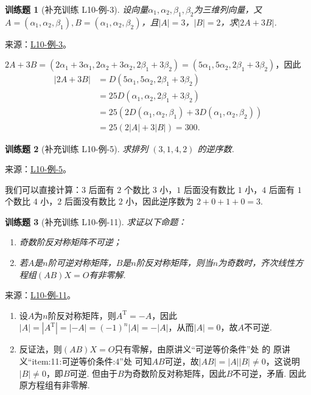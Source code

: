 \documentclass[12pt,fontset=fandol]{ctexart}
\newtheorem{exercise}{训练题}[section]
\begin{document}
\begin{exercise}[补充训练 L10-例-3]\label{prob:L10-例-3}
设向量$\alpha_1,\alpha_2,\beta_1,\beta_2$为三维列向量，又$A=(\alpha_1,\alpha_2,\beta_1),B=(\alpha_1,\alpha_2,\beta_2)$，且$|A|=3$，$|B|=2$，求$|2A+3B|$.
\end{exercise}
\noindent 来源：\href{https://github.com/yhwu-is/Linear-Algebra-Left-Undone/blob/new/%E8%AE%B2%E4%B9%89/%E4%B8%93%E9%A2%98/10%20%E8%A1%8C%E5%88%97%E5%BC%8F.tex}{L10-例-3}。
\begin{solve}
$2A+3B=(2\alpha_1+3\alpha_1,2\alpha_2+3\alpha_2,2\beta_1+3\beta_2)=(5\alpha_1,5\alpha_2,2\beta_1+3\beta_2)$，因此
    \begin{align*}
        |2A+3B| & =D(5\alpha_1,5\alpha_2,2\beta_1+3\beta_2)                        \\
                & =25D(\alpha_1,\alpha_2,2\beta_1+3\beta_2)                        \\
                & =25(2D(\alpha_1,\alpha_2,\beta_1)+3D(\alpha_1,\alpha_2,\beta_2)) \\
                & =25(2|A|+3|B|)=300.
    \end{align*}
\end{solve}

\begin{exercise}[补充训练 L10-例-5]\label{prob:L10-例-5}
求排列 $(3,1,4,2)$ 的逆序数.
\end{exercise}
\noindent 来源：\href{https://github.com/yhwu-is/Linear-Algebra-Left-Undone/blob/new/%E8%AE%B2%E4%B9%89/%E4%B8%93%E9%A2%98/10%20%E8%A1%8C%E5%88%97%E5%BC%8F.tex}{L10-例-5}。
\begin{solve}
我们可以直接计算：$3$ 后面有 $2$ 个数比 $3$ 小，$1$ 后面没有数比 $1$ 小，$4$ 后面有 $1$ 个数比 $4$ 小，$2$ 后面没有数比 $2$ 小，因此逆序数为 $2+0+1+0=3$.
\end{solve}

\begin{exercise}[补充训练 L10-例-11]\label{prob:L10-例-11}
求证以下命题：
    \begin{enumerate}
        \item 奇数阶反对称矩阵不可逆；

        \item 若$A$是$n$阶可逆对称矩阵，$B$是$n$阶反对称矩阵，则当$n$为奇数时，齐次线性方程组$(AB)X=O$有非零解.
    \end{enumerate}
\end{exercise}
\noindent 来源：\href{https://github.com/yhwu-is/Linear-Algebra-Left-Undone/blob/new/%E8%AE%B2%E4%B9%89/%E4%B8%93%E9%A2%98/10%20%E8%A1%8C%E5%88%97%E5%BC%8F.tex}{L10-例-11}。
\begin{solve}
\begin{enumerate}
        \item 设$A$为$n$阶反对称矩阵，则$A^\mathrm{T}=-A$，因此$|A|=|A^\mathrm{T}|=|-A|=(-1)^n|A|=-|A|$，从而$|A|=0$，故$A$不可逆.
        \item 反证法，则$(AB)X=O$只有零解，由原讲义“可逆等价条件”处 的 原讲义“item:11:可逆等价条件:4”处 可知$AB$可逆，故$|AB|=|A||B|\neq 0$，这说明$|B|\neq 0$，即$B$可逆. 但由于$B$为奇数阶反对称矩阵，因此$B$不可逆，矛盾. 因此原方程组有非零解.
    \end{enumerate}
\end{solve}
\end{document}
